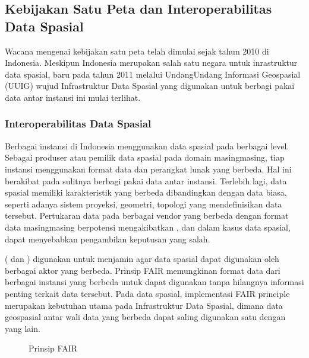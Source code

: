 \documentclass[letterpaper,10pt,english]{sphinxmanual}
\begin{document}
\subsection{Kebijakan Satu Peta dan Interoperabilitas Data Spasial}
\label{\detokenize{sesi3/interoperabilitas:kebijakan-satu-peta-dan-interoperabilitas-data-spasial}}
Wacana mengenai kebijakan satu peta telah dimulai sejak tahun 2010 di Indonesia. Meskipun Indonesia merupakan salah satu negara  untuk inrastruktur data spasial, baru pada tahun 2011 melalui Undang\sphinxhyphen{}Undang Informasi Geospasial (UUIG) wujud Infrastruktur Data Spasial yang digunakan untuk berbagi pakai data antar instansi ini mulai terlihat.


\subsubsection{Interoperabilitas Data Spasial}
\label{\detokenize{sesi3/interoperabilitas:interoperabilitas-data-spasial}}
Berbagai instansi di Indonesia menggunakan data spasial pada berbagai level. Sebagai produser atau pemilik data spasial pada domain masing\sphinxhyphen{}masing, tiap instansi menggunakan format data dan perangkat lunak yang berbeda. Hal ini berakibat pada sulitnya berbagi pakai data antar instansi. Terlebih lagi, data spasial memiliki karakteristik yang berbeda dibandingkan dengan data biasa, seperti adanya sistem proyeksi, geometri, topologi yang mendefinisikan data tersebut. Pertukaran data pada berbagai vendor yang berbeda dengan format data masing\sphinxhyphen{}masing berpotensi mengakibatkan , dan dalam kasus data spasial, dapat menyebabkan pengambilan keputusan yang salah.

 ( dan ) digunakan untuk menjamin agar data spasial dapat digunakan oleh berbagai aktor yang berbeda. Prinsip FAIR memungkinan format data dari berbagai instansi yang berbeda untuk dapat digunakan tanpa hilangnya informasi penting terkait data tersebut. Pada data spasial, implementasi FAIR principle merupakan kebutuhan utama pada Infrastruktur Data Spasial, dimana data geospasial antar wali data yang berbeda dapat saling digunakan satu dengan yang lain.

\begin{figure}[htbp]
\centering
\capstart

\noindent{}
\caption{Prinsip FAIR}\label{\detokenize{sesi3/interoperabilitas:fairprinciple}}\end{figure}
\end{document}
